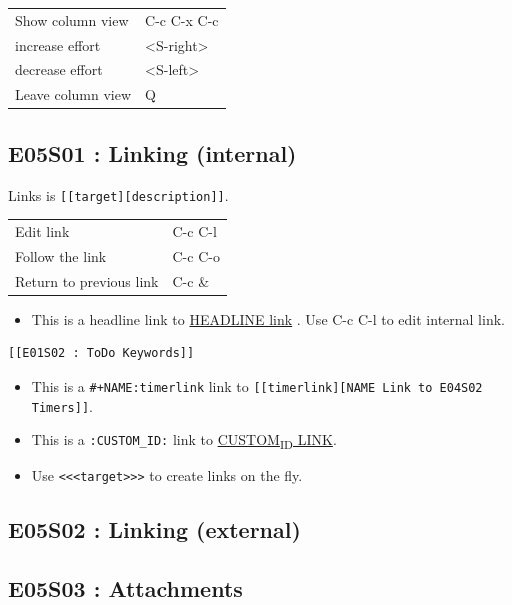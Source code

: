 \documentclass[11pt]{article}
\begin{document}
\begin{center}
\begin{tabular}{ll}
Show column view &  C-c C-x C-c \\
increase effort &  <S-right> \\
decrease effort &  <S-left> \\
Leave column view &  Q \\
\end{tabular}
\end{center}

\subsection{E05S01 : Linking (internal)}
\label{sec:orgc168559}
Links is \texttt{[[target][description]]}. 

\begin{center}
\begin{tabular}{ll}
Edit link &  C-c C-l \\
Follow the link &  C-c C-o \\
Return to previous link &  C-c \& \\
\end{tabular}
\end{center}

\begin{itemize}
\item This is a headline link to \hyperref[sec:orgca580b2]{HEADLINE link} . Use  C-c
C-l  to edit internal link.
\end{itemize}
\begin{verbatim}
[[E01S02 : ToDo Keywords]]
\end{verbatim}
\begin{itemize}
\item This is a \texttt{\#+NAME:timerlink} link to \texttt{[[timerlink][NAME Link to E04S02 Timers]]}.
\item This is a \texttt{:CUSTOM\_ID:} link to \hyperref[sec:org1095237]{CUSTOM\textsubscript{ID} LINK}.
\item Use \texttt{<<<target>>>} to create links on the fly.
\end{itemize}
\subsection{E05S02 : Linking (external)}
\label{sec:org182a65b}
\subsection{E05S03 : Attachments}
\label{sec:org19bb39c}
\end{document}
